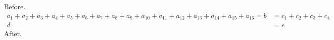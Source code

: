 \documentclass[10pt]{article}
\begin{document}
Before.
\begin{align}
 a_1 + a_2 + a_3 + a_4 + a_5 + a_6 + a_7 + a_8 + a_9 + a_{10} + a_{11} + a_{12} + a_{13} + a_{14} + a_{15} + a_{16} = b &= c_1 + c_2 + c_3 + c_4 \tag{a long tag $x$}\\
 d &= e
\end{align}
After.
\end{document}

